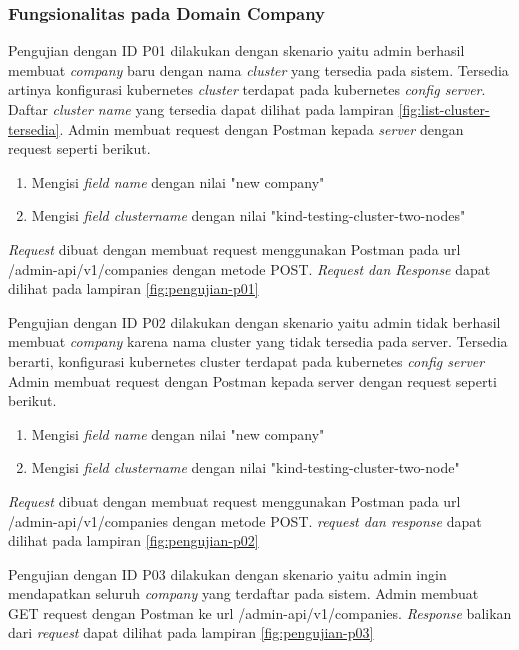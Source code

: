 \subsubsection{Fungsionalitas pada Domain Company}

Pengujian dengan ID P01 dilakukan dengan skenario yaitu admin berhasil membuat \textit{company} baru dengan nama \textit{cluster} yang tersedia pada sistem. Tersedia artinya konfigurasi kubernetes \textit{cluster} terdapat pada kubernetes \textit{config server}. Daftar \textit{cluster name} yang tersedia dapat dilihat pada lampiran \ref{fig:list-cluster-tersedia}. Admin membuat request dengan Postman kepada \textit{server} dengan request seperti berikut.

\begin{enumerate}
  \item Mengisi \textit{field name} dengan nilai "new company"
  \item Mengisi \textit{field cluster\textunderscore name} dengan nilai "kind-testing-cluster-two-nodes"
\end{enumerate}

\textit{Request} dibuat dengan membuat request menggunakan Postman pada url /admin-api/v1/companies dengan metode POST. \textit{Request dan Response} dapat dilihat pada lampiran \ref{fig:pengujian-p01}

Pengujian dengan ID P02 dilakukan dengan skenario yaitu admin tidak berhasil membuat \textit{company} karena nama cluster yang tidak tersedia pada server. Tersedia berarti, konfigurasi kubernetes cluster terdapat pada kubernetes \textit{config server} Admin membuat request dengan Postman kepada server dengan request seperti berikut.

\begin{enumerate}
  \item Mengisi \textit{field name} dengan nilai "new company"
  \item Mengisi \textit{field cluster\textunderscore name} dengan nilai "kind-testing-cluster-two-node"
\end{enumerate}

\textit{Request} dibuat dengan membuat request menggunakan Postman pada url /admin-api/v1/companies dengan metode POST. \textit{request dan response} dapat dilihat pada lampiran \ref{fig:pengujian-p02}


Pengujian dengan ID P03 dilakukan dengan skenario yaitu admin ingin mendapatkan seluruh \textit{company} yang terdaftar pada sistem. Admin membuat GET request dengan Postman ke url /admin-api/v1/companies. \textit{Response} balikan dari \textit{request} dapat dilihat pada lampiran \ref{fig:pengujian-p03}

